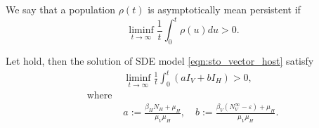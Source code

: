 \begin{definition}
    We say that a population $\rho(t)$ is asymptotically mean persistent
    if
    $$
        \liminf_{t \to \infty}
            \frac{1}{t}
                \int_{0} ^ t
                    \rho(u) du
        > 0.
    $$
\end{definition}
\begin{theorem}
    Let  hold, then the solution of SDE model
    \eqref{eqn:sto_vector_host} satisfy
    \begin{align*}
        &\liminf_{t \to \infty}
            \frac{1}{t}
            \int_{0} ^ {t}
            (a I_V + b I_H) > 0, 
            \\
                \text{where }
            &
            \\
            & a:= \frac{\beta_H N_H + \mu_H}{\mu_V \mu_H},
            \quad
            b:=
            \frac{
                \beta_V (N_V ^ {\infty} - \varepsilon)
                + \mu_H
                }{\mu_V \mu_H}.
    \end{align*}
\end{theorem}
%
